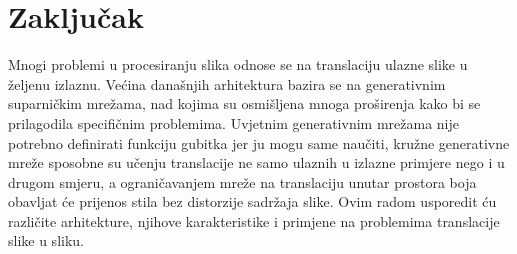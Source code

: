 \documentclass[lmodern, utf8, seminar]{fer}
\begin{document}
\chapter{Zaključak}









\begin{sazetak}
Mnogi problemi u procesiranju slika odnose se na translaciju ulazne slike u željenu izlaznu. Većina današnjih arhitektura bazira se na generativnim suparničkim mrežama, nad kojima su osmišljena mnoga proširenja kako bi se prilagodila specifičnim problemima. Uvjetnim generativnim mrežama nije potrebno definirati funkciju gubitka jer ju mogu same naučiti, kružne generativne mreže sposobne su učenju translacije ne samo ulaznih u izlazne primjere nego i u drugom smjeru, a ograničavanjem mreže na translaciju unutar prostora boja obavljat će prijenos stila bez distorzije sadržaja slike. Ovim radom usporedit ću različite arhitekture, njihove karakteristike i primjene na problemima translacije slike u sliku.

\end{sazetak}

\begin{abstract}

\end{abstract}
\end{document}
